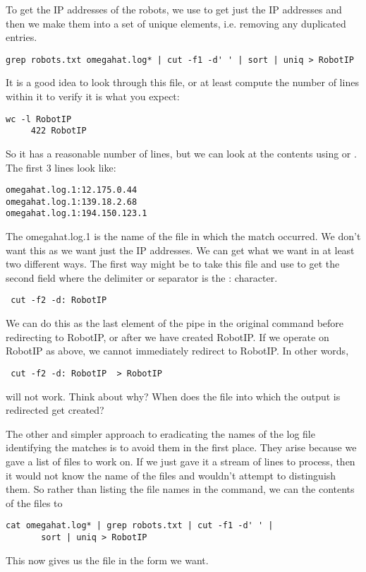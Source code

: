 \begin{enumerate}
To get the IP addresses of the robots, we use 
to get just the IP addresses and then we make them into a set
of unique elements, i.e. removing any duplicated entries.
\begin{verbatim}
grep robots.txt omegahat.log* | cut -f1 -d' ' | sort | uniq > RobotIP
\end{verbatim}
It is a good idea to look through this file, or at least compute the number of
lines within it to verify it is what you expect:
\begin{verbatim}
wc -l RobotIP 
     422 RobotIP
\end{verbatim}
So it has a reasonable number of lines, but we can look at the contents
using  or .
The first $3$ lines look like:
\begin{verbatim}
omegahat.log.1:12.175.0.44
omegahat.log.1:139.18.2.68
omegahat.log.1:194.150.123.1
\end{verbatim}
The omegahat.log.1 is the name of the file in which the match occurred.
We don't want this as we want just the IP addresses.
We can get what we want in at least two different ways.
The first way might be to take this file and use
 to get the second field where the delimiter or separator
is the : character.
\begin{verbatim}
 cut -f2 -d: RobotIP  
\end{verbatim}
We can do this as the last element of the pipe in the original command before redirecting
to RobotIP,  or after we have created RobotIP. If we operate on RobotIP as above, 
we cannot immediately redirect to RobotIP.
In other words,
\begin{verbatim}
 cut -f2 -d: RobotIP  > RobotIP
\end{verbatim}
will not  work.   Think about why? When does the file into which the output is redirected
get created?

The other and simpler approach to eradicating the names of the log file identifying the matches
is to avoid them in the first place.
They arise because we gave  a list of files  to work on.
If we just gave it a stream of lines to process, then it would not know the name
of the files and wouldn't  attempt to distinguish them. 
So rather than listing the file names in the  command, we can
 the contents of the files to 
\begin{verbatim}
cat omegahat.log* | grep robots.txt | cut -f1 -d' ' | 
       sort | uniq > RobotIP
\end{verbatim}
This now gives us the file in the form we want.



\end{enumerate}
